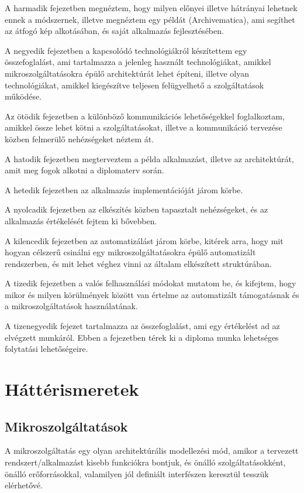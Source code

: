 \documentclass[11pt,magyar,a4paper,twoside,]{report}
\begin{document}
A harmadik fejezetben megnéztem, hogy milyen előnyei illetve hátrányai
lehetnek ennek a módszernek, illetve megnéztem egy példát
(Archivematica), ami segíthet az átfogó kép alkotásában, és saját
alkalmazás fejlesztésében.

A negyedik fejezetben a kapcsolódó technológiákról készítettem egy
összefoglalást, ami tartalmazza a jelenleg használt technológiákat,
amikkel mikroszolgáltatásokra épülő architektúrát lehet építeni, illetve
olyan technológiákat, amikkel kiegészítve teljesen felügyelhető a
szolgáltatások működése.

Az ötödik fejezetben a különböző kommunikációs lehetőségekkel
foglalkoztam, amikkel össze lehet kötni a szolgáltatásokat, illetve a
kommunikáció tervezése közben felmerülő nehézségeket néztem át.

A hatodik fejezetben megterveztem a példa alkalmazást, illetve az
architektúrát, amit meg fogok alkotni a diplomaterv során.

A hetedik fejezetben az alkalmazás implementációját járom körbe.

A nyolcadik fejezetben az elkészítés közben tapasztalt nehézségeket, és
az alkalmazás értékelését fejtem ki bővebben.

A kilencedik fejezetben az automatizálást járom körbe, kitérek arra,
hogy mit hogyan célszerű csinálni egy mikroszolgáltatásokra épülő
automatizált rendszerben, és mit lehet véghez vinni az általam
elkészített struktúrában.

A tizedik fejezetben a valós felhasználási módokat mutatom be, és
kifejtem, hogy mikor és milyen körülmények között van értelme az
automatizált támogatásnak és a mikroszolgáltatások használatának.

A tizenegyedik fejezet tartalmazza az összefoglalást, ami egy értékelést
ad az elvégzett munkáról. Ebben a fejezetben térek ki a diploma munka
lehetséges folytatási lehetőségeire.

\chapter{Háttérismeretek}\label{huxe1ttuxe9rismeretek}

\section{Mikroszolgáltatások}\label{mikroszolguxe1ltatuxe1sok}

A mikroszolgáltatás\citep{microservices} \citep{micro-arch}
\citep{microservices-light} egy olyan architektúrális modellezési mód,
amikor a tervezett rendszert/alkalmazást kisebb funkciókra bontjuk, és
önálló szolgáltatásokként, önálló erőforrásokkal, valamilyen jól
definiált interfészen keresztül tesszük elérhetővé.
\end{document}
